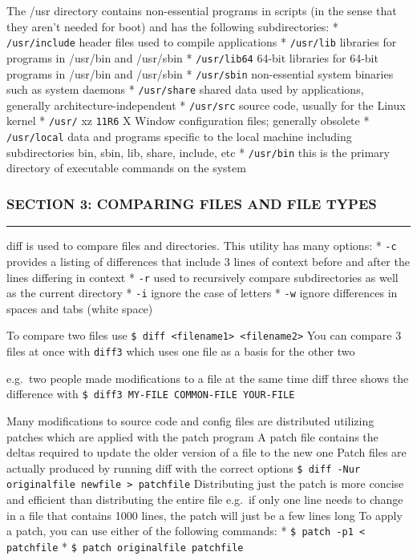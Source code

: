 The /usr directory contains non-essential programs in scripts (in the
sense that they aren't needed for boot) and has the following
subdirectories: * \texttt{/usr/include} header files used to compile
applications * \texttt{/usr/lib} libraries for programs in /usr/bin and
/usr/sbin * \texttt{/usr/lib64} 64-bit libraries for 64-bit programs in
/usr/bin and /usr/sbin * \texttt{/usr/sbin} non-essential system
binaries such as system daemons * \texttt{/usr/share} shared data used
by applications, generally architecture-independent * \texttt{/usr/src}
source code, usually for the Linux kernel * \texttt{/usr/} xz
\texttt{11R6} X Window configuration files; generally obsolete *
\texttt{/usr/local} data and programs specific to the local machine
including subdirectories bin, sbin, lib, share, include, etc *
\texttt{/usr/bin} this is the primary directory of executable commands
on the system

\subsubsection{SECTION 3: COMPARING FILES AND FILE
TYPES}\label{section-3-comparing-files-and-file-types}

\begin{center}\rule{3in}{0.4pt}\end{center}

diff is used to compare files and directories. This utility has many
options: * \texttt{-c} provides a listing of differences that include 3
lines of context before and after the lines differing in context *
\texttt{-r} used to recursively compare subdirectories as well as the
current directory * \texttt{-i} ignore the case of letters * \texttt{-w}
ignore differences in spaces and tabs (white space)

To compare two files use
\texttt{\$ diff \textless{}filename1\textgreater{} \textless{}filename2\textgreater{}}
You can compare 3 files at once with \texttt{diff3} which uses one file
as a basis for the other two

e.g.~two people made modifications to a file at the same time diff three
shows the difference with
\texttt{\$ diff3 MY-FILE COMMON-FILE YOUR-FILE}

Many modifications to source code and config files are distributed
utilizing patches which are applied with the patch program A patch file
contains the deltas required to update the older version of a file to
the new one Patch files are actually produced by running diff with the
correct options
\texttt{\$ diff -Nur originalfile newfile \textgreater{} patchfile}
Distributing just the patch is more concise and efficient than
distributing the entire file e.g.~if only one line needs to change in a
file that contains 1000 lines, the patch will just be a few lines long
To apply a patch, you can use either of the following commands: *
\texttt{\$ patch -p1 \textless{} patchfile} *
\texttt{\$ patch originalfile patchfile}

